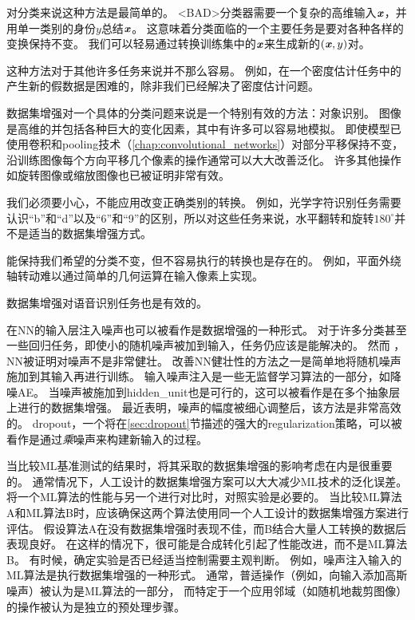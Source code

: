 对分类来说这种方法是最简单的。
<BAD>分类器需要一个复杂的高维输入$\boldsymbol{\mathit{x}}$，并用单一类别的身份$y$总结$\boldsymbol{\mathit{x}}$。
这意味着分类面临的一个主要任务是要对各种各样的变换保持不变。
我们可以轻易通过转换训练集中的$\boldsymbol{\mathit{x}}$来生成新的$(\boldsymbol{\mathit{x}}, y)$对。

这种方法对于其他许多任务来说并不那么容易。
例如，在一个密度估计任务中的产生新的假数据是困难的，除非我们已经解决了密度估计问题。

数据集增强对一个具体的分类问题来说是一个特别有效的方法：对象识别。
图像是高维的并包括各种巨大的变化因素，其中有许多可以容易地模拟。
即使模型已使用卷积和\gls{pooling}技术（\ref{chap:convolutional_networks}）对部分平移保持不变，沿训练图像每个方向平移几个像素的操作通常可以大大改善泛化。
许多其他操作如旋转图像或缩放图像也已被证明非常有效。

我们必须要小心，不能应用改变正确类别的转换。
例如，光学字符识别任务需要认识``b''和``d''以及``6''和``9''的区别，所以对这些任务来说，水平翻转和旋转$180^{\circ}$并不是适当的数据集增强方式。


能保持我们希望的分类不变，但不容易执行的转换也是存在的。
例如，平面外绕轴转动难以通过简单的几何运算在输入像素上实现。

数据集增强对语音识别任务也是有效的\citep{Jaitly_VTLP_2013}。

在\gls{NN}的输入层注入噪声\citep{SietsmaDow91}也可以被看作是数据增强的一种形式。
对于许多分类甚至一些回归任务，即使小的随机噪声被加到输入，任务仍应该是能解决的。
然而 ，\gls{NN}被证明对噪声不是非常健壮\citep{TangElias10}。
改善\gls{NN}健壮性的方法之一是简单地将随机噪声施加到其输入再进行训练。
输入噪声注入是一些无监督学习算法的一部分，如降噪\gls{AE}\citep{VincentPLarochelleH2008}。
当噪声被施加到\gls{hidden_unit}也是可行的，这可以被看作是在多个抽象层上进行的数据集增强。
\cite{Poole14}最近表明，噪声的幅度被细心调整后，该方法是非常高效的。
\gls{dropout}，一个将在\ref{sec:dropout}节描述的强大的\gls{regularization}策略，可以被看作是通过\emph{乘}噪声来构建新输入的过程。

当比较\gls{ML}基准测试的结果时，将其采取的数据集增强的影响考虑在内是很重要的。
通常情况下，人工设计的数据集增强方案可以大大减少\gls{ML}技术的泛化误差。
将一个\gls{ML}算法的性能与另一个进行对比时，对照实验是必要的。
当比较\gls{ML}算法A和\gls{ML}算法B时，应该确保这两个算法使用同一个人工设计的数据集增强方案进行评估。
假设算法A在没有数据集增强时表现不佳，而B结合大量人工转换的数据后表现良好。
在这样的情况下，很可能是合成转化引起了性能改进，而不是\gls{ML}算法B。 
有时候，确定实验是否已经适当控制需要主观判断。
例如，噪声注入输入的\gls{ML}算法是执行数据集增强的一种形式。
通常，普适操作（例如，向输入添加高斯噪声）被认为是\gls{ML}算法的一部分，
而特定于一个应用邻域（如随机地裁剪图像）的操作被认为是独立的预处理步骤。

